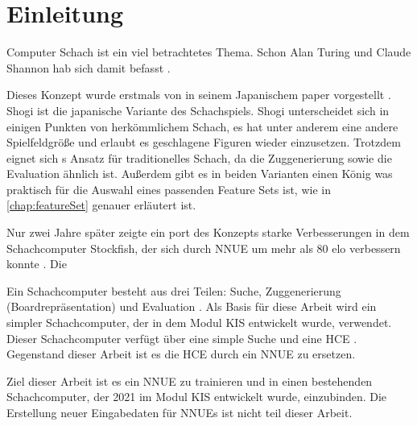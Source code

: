 \chapter{Einleitung}

Computer Schach ist ein viel betrachtetes Thema. Schon Alan Turing und Claude Shannon hab sich damit befasst \cite{Turing1953, Shannon1950}.

Dieses Konzept wurde erstmals \citeyear{YNasu2018} von \citeauthor{YNasu2018} in seinem Japanischem paper vorgestellt \cite{YNasu2018}. Shogi ist die japanische Variante des Schachspiels. Shogi unterscheidet sich in einigen Punkten von herkömmlichem Schach, es hat unter anderem eine andere Spielfeldgröße und erlaubt es geschlagene Figuren wieder einzusetzen. Trotzdem eignet sich \citeauthor{YNasu2018}s Ansatz für traditionelles Schach, da die Zuggenerierung sowie die Evaluation ähnlich ist. Außerdem gibt es in beiden Varianten einen König was praktisch für die Auswahl eines passenden Feature Sets ist, wie in \autoref{chap:featureSet} genauer erläutert ist.


Nur zwei Jahre später zeigte ein port des Konzepts starke Verbesserungen in dem Schachcomputer Stockfish, der sich durch \ac{NNUE} um mehr als 80 elo verbessern konnte \cite{StockfishIntroducingNNUE}. Die


Ein Schachcomputer besteht aus drei Teilen: Suche, Zuggenerierung (Boardrepräsentation) und Evaluation \cite{VazquezFernandez2013}. Als Basis für diese Arbeit wird ein simpler Schachcomputer, der in dem Modul \ac{KIS} entwickelt wurde, verwendet. Dieser Schachcomputer verfügt über eine simple Suche und eine \ac{HCE} \cite{nopy}. Gegenstand dieser Arbeit ist es die \ac{HCE} durch ein \ac{NNUE} zu ersetzen.

Ziel dieser Arbeit ist es ein \ac{NNUE} zu trainieren und in einen bestehenden Schachcomputer, der 2021 im Modul \ac{KIS} entwickelt wurde, einzubinden. Die Erstellung neuer Eingabedaten für \acp{NNUE} ist nicht teil dieser Arbeit.
